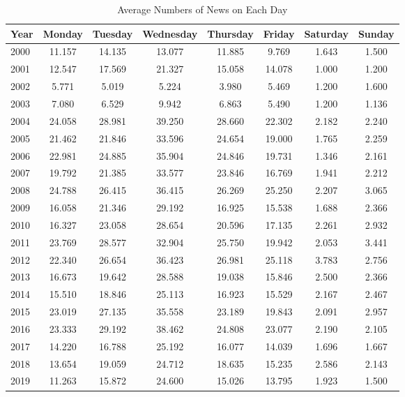 \documentclass[12pt]{article}
\begin{document}
	\begin{table}[H]
		\centering
		\small
		\caption{Average Numbers of News on Each Day}
		\begin{tabular}{l|c|c|c|c|c|c|c}
			\toprule
			Year & Monday &Tuesday &Wednesday &Thursday &Friday &Saturday &Sunday \\ 
			\midrule
2000 & 11.157 & 14.135 & 13.077 & 11.885 & 9.769 & 1.643 & 1.500 \\
2001 & 12.547 & 17.569 & 21.327 & 15.058 & 14.078 & 1.000 & 1.200 \\
2002 & 5.771 & 5.019 & 5.224 & 3.980 & 5.469 & 1.200 & 1.600 \\
2003 & 7.080 & 6.529 & 9.942 & 6.863 & 5.490 & 1.200 & 1.136 \\
2004 & 24.058 & 28.981 & 39.250 & 28.660 & 22.302 & 2.182 & 2.240 \\
2005 & 21.462 & 21.846 & 33.596 & 24.654 & 19.000 & 1.765 & 2.259 \\
2006 & 22.981 & 24.885 & 35.904 & 24.846 & 19.731 & 1.346 & 2.161 \\
2007 & 19.792 & 21.385 & 33.577 & 23.846 & 16.769 & 1.941 & 2.212 \\
2008 & 24.788 & 26.415 & 36.415 & 26.269 & 25.250 & 2.207 & 3.065 \\
2009 & 16.058 & 21.346 & 29.192 & 16.925 & 15.538 & 1.688 & 2.366 \\
2010 & 16.327 & 23.058 & 28.654 & 20.596 & 17.135 & 2.261 & 2.932 \\
2011 & 23.769 & 28.577 & 32.904 & 25.750 & 19.942 & 2.053 & 3.441 \\
2012 & 22.340 & 26.654 & 36.423 & 26.981 & 25.118 & 3.783 & 2.756 \\
2013 & 16.673 & 19.642 & 28.588 & 19.038 & 15.846 & 2.500 & 2.366 \\
2014 & 15.510 & 18.846 & 25.113 & 16.923 & 15.529 & 2.167 & 2.467 \\
2015 & 23.019 & 27.135 & 35.558 & 23.189 & 19.843 & 2.091 & 2.957 \\
2016 & 23.333 & 29.192 & 38.462 & 24.808 & 23.077 & 2.190 & 2.105 \\
2017 & 14.220 & 16.788 & 25.192 & 16.077 & 14.039 & 1.696 & 1.667 \\
2018 & 13.654 & 19.059 & 24.712 & 18.635 & 15.235 & 2.586 & 2.143 \\
2019 & 11.263 & 15.872 & 24.600 & 15.026 & 13.795 & 1.923 & 1.500 \\
		\bottomrule
		\end{tabular}
	\end{table}
\end{document}
